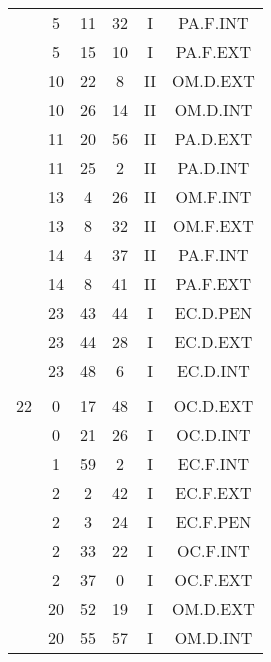 \documentclass[12pt, a4paper]{article}
\begin{document}
\begin{multicols}{3}
{\begin{tabular}{c c c c c c}
	 	 	 	 & 5 & 11 & 32 & I & PA.F.INT\\%
	 	 	 	 & 5 & 15 & 10 & I & PA.F.EXT\\%
	 	 	 	 & 10 & 22 & 8 & II & OM.D.EXT\\%
	 	 	 	 & 10 & 26 & 14 & II & OM.D.INT\\%
	 	 	 	 & 11 & 20 & 56 & II & PA.D.EXT\\%
	 	 	 	 & 11 & 25 & 2 & II & PA.D.INT\\%
	 	 	 	 & 13 & 4 & 26 & II & OM.F.INT\\%
	 	 	 	 & 13 & 8 & 32 & II & OM.F.EXT\\%
	 	 	 	 & 14 & 4 & 37 & II & PA.F.INT\\%
	 	 	 	 & 14 & 8 & 41 & II & PA.F.EXT\\%
	 	 	 	 & 23 & 43 & 44 & I & EC.D.PEN\\%
	 	 	 	 & 23 & 44 & 28 & I & EC.D.EXT\\%
	 	 	 	 & 23 & 48 & 6 & I & EC.D.INT\\%
	 	 	 	 & & & & & \\%
	 	 	 	22 & 0 & 17 & 48 & I & OC.D.EXT\\%
	 	 	 	 & 0 & 21 & 26 & I & OC.D.INT\\%
	 	 	 	 & 1 & 59 & 2 & I & EC.F.INT\\%
	 	 	 	 & 2 & 2 & 42 & I & EC.F.EXT\\%
	 	 	 	 & 2 & 3 & 24 & I & EC.F.PEN\\%
	 	 	 	 & 2 & 33 & 22 & I & OC.F.INT\\%
	 	 	 	 & 2 & 37 & 0 & I & OC.F.EXT\\%
	 	 	 	 & 20 & 52 & 19 & I & OM.D.EXT\\%
	 	 	 	 & 20 & 55 & 57 & I & OM.D.INT\\%

\end{tabular}}
\end{multicols}
\end{document}
